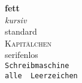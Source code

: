 \textbf{fett} \\
\textit{kursiv} \\
\textrm{standard} \\
\textsc{Kapitälchen} \\
\textsf{serifenlos} \\
\texttt{Schreibmaschine}\\
\verb!alle  Leerzeichen!\\

